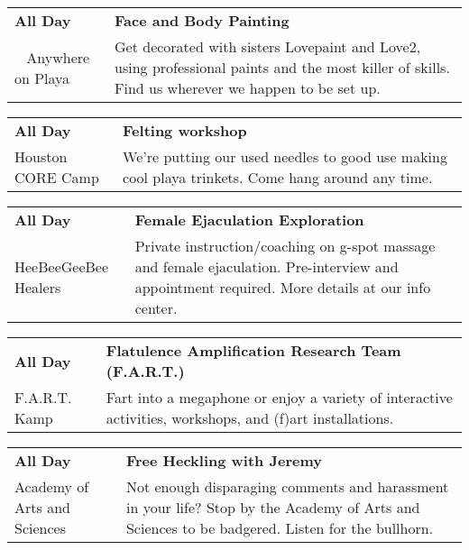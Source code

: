 \begin{tabular}{ p{1in} p{2.2in} }
    \textbf{All Day} & \textbf{Face and Body Painting} \\
    ~ \newline Anywhere on Playa & Get decorated with sisters Lovepaint and Love2, using professional paints and the most killer of skills. Find us wherever we happen to be set up. \\
    \hline 
\end{tabular}
    
\begin{tabular}{ p{1in} p{2.2in} }
    \textbf{All Day} & \textbf{Felting workshop} \\
    Houston CORE Camp \newline  & We're putting our used needles to good use making cool playa trinkets. Come hang around any time. \\
    \hline 
\end{tabular}
    
\begin{tabular}{ p{1in} p{2.2in} }
    \textbf{All Day} & \textbf{Female Ejaculation Exploration} \\
    HeeBeeGeeBee Healers \newline  & Private instruction/coaching on g-spot massage and female ejaculation.  Pre-interview and appointment required.  More details at our info center. \\
    \hline 
\end{tabular}
    
\begin{tabular}{ p{1in} p{2.2in} }
    \textbf{All Day} & \textbf{Flatulence Amplification Research Team (F.A.R.T.) } \\
    F.A.R.T. Kamp \newline  & Fart into a megaphone or enjoy a variety of interactive activities, workshops, and (f)art installations. \\
    \hline 
\end{tabular}
    
\begin{tabular}{ p{1in} p{2.2in} }
    \textbf{All Day} & \textbf{Free Heckling with Jeremy} \\
    Academy of Arts and Sciences \newline  & Not enough disparaging comments and harassment in your life?  Stop by the Academy of Arts and Sciences to be badgered.  Listen for the bullhorn. \\
    \hline 
\end{tabular}
    
